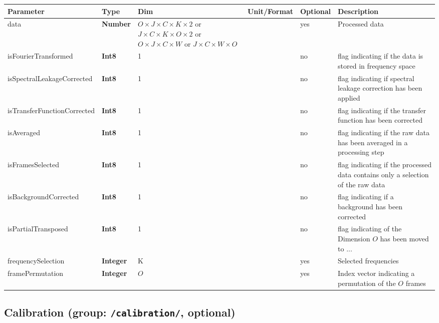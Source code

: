 \documentclass[landscape,a4paper]{article} %
\newcommand{\inl}[1]{\lstinline[columns=fixed]{#1}}
\newcommand{\inltab}[1]{{\ttfamily\bfseries\color{blue}#1}}
\newcommand{\inlvar}[1]{{\ttfamily#1}}
\begin{document}
\noindent \begin{tabularx}{\columnwidth}{llp{3cm}llX} 
\textbf{Parameter} & \textbf{Type} & \textbf{Dim} & \textbf{Unit/Format} & \textbf{Optional} & \textbf{Description} \\ \hline 
\inlvar{data} & \inltab{Number} & $O \times J \times C \times K\times 2$ or $ J \times C \times K\times O \times 2$ or $O \times J \times C \times W$ or $ J \times C \times W \times O$ & & yes & Processed data \\ \hline 
\inlvar{isFourierTransformed} & \inltab{Int8} & 1 & & no & flag indicating if the data is stored in frequency space \\ \hline
\inlvar{isSpectralLeakageCorrected} & \inltab{Int8} & 1 & & no & flag indicating if spectral leakage correction has been applied \\ \hline
\inlvar{isTransferFunctionCorrected} & \inltab{Int8} & 1 & & no & flag indicating if the transfer function has been corrected \\ \hline 
\inlvar{isAveraged} & \inltab{Int8} & 1 & & no & flag indicating if the raw data has been averaged in a processing step \\ \hline 
\inlvar{isFramesSelected} & \inltab{Int8} & 1 & & no & flag indicating if the processed data contains only a selection of the raw data \\ \hline
\inlvar{isBackgroundCorrected} & \inltab{Int8} & 1 & & no & flag indicating if a background has been corrected \\ \hline
\inlvar{isPartialTransposed} & \inltab{Int8} & 1 & & no & flag indicating of the Dimension $O$ has been moved to ...\\ \hline
\inlvar{frequencySelection} & \inltab{Integer} & K & & yes & Selected frequencies \\ \hline
\inlvar{framePermutation} & \inltab{Integer} & $O$ & & yes & Index vector indicating a permutation of the $O$ frames\\ \hline 

\end{tabularx} 

\subsection{Calibration (group: \inl{/calibration/}, optional)}
\end{document}
